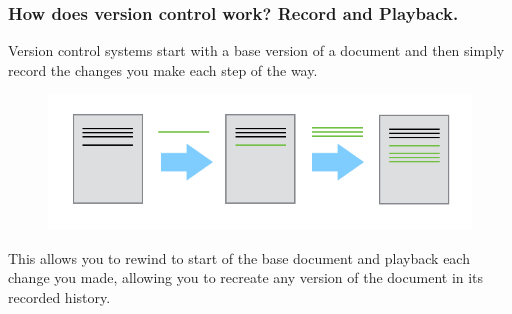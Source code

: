 \documentclass{beamer}
\begin{document}
\begin{frame}
   \frametitle{How does version control work? Record and Playback.}
   Version control systems start with a base version of a document and
   then simply record the changes you make each step of the way.
   \begin{figure}[htbp]
      \includegraphics[width=1.0\textwidth]{images/play-changes.png}
   \end{figure}
   This allows you to rewind to start of the base document and playback
   each change you made, allowing you to recreate any version of the 
   document in its recorded history. 
\end{frame}
\end{document}

